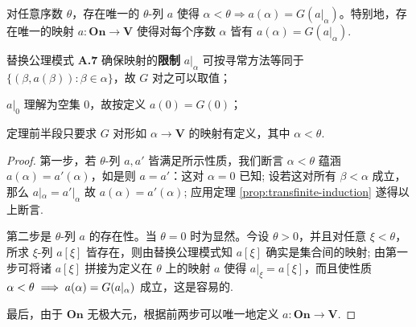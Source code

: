 \begin{theorem}[超穷递归原理]
	对任意序数 $\theta$，存在唯一的 $\theta$-列 $a$ 使得 $\alpha < \theta \Rightarrow a(\alpha) = G(a|_\alpha)$。特别地，存在唯一的映射 $a: \mathbf{On} \to \mathbf{V}$ 使得对每个序数 $\alpha$ 皆有 $a(\alpha) = G(a|_\alpha)$.
\end{theorem}
\begin{remark}
	\begin{inparaenum}[(a)]
	\item 替换公理模式 \textbf{A.7} 确保映射的\textbf{限制} $a|_\alpha$ 可按寻常方法等同于 $\{ (\beta, a(\beta)) : \beta \in \alpha \}$，故 $G$ 对之可以取值；
	\item $a|_0$ 理解为空集 $0$，故按定义 $a(0) = G(0)$；
	\item 定理前半段只要求 $G$ 对形如 $\alpha \to \mathbf{V}$ 的映射有定义，其中 $\alpha < \theta$.
\end{inparaenum}
\end{remark}

\begin{proof}
	第一步，若 $\theta$-列 $a, a'$ 皆满足所示性质，我们断言 $\alpha < \theta$ 蕴涵 $a(\alpha) = a'(\alpha)$，如是则 $a=a'$：这对 $\alpha=0$ 已知; 设若这对所有 $\beta < \alpha$ 成立，那么 $a|_\alpha = a'|_\alpha$ 故 $a(\alpha) = a'(\alpha)$; 应用定理 \ref{prop:transfinite-induction} 遂得以上断言.
	
	第二步是 $\theta$-列 $a$ 的存在性。当 $\theta=0$ 时为显然。今设 $\theta > 0$，并且对任意 $\xi < \theta$，所求 $\xi$-列 $a[\xi]$ 皆存在，则由替换公理模式知 $a[\xi]$ 确实是集合间的映射; 由第一步可将诸 $a[\xi]$ 拼接为定义在 $\theta$ 上的映射 $a$ 使得 $a|_\xi = a[\xi]$，而且使性质 $\alpha < \theta \implies a(\alpha) = G(a|_\alpha)$ 成立，这是容易的.
	
	最后，由于 $\mathbf{On}$ 无极大元，根据前两步可以唯一地定义 $a: \mathbf{On} \to \mathbf{V}$.
\end{proof}


